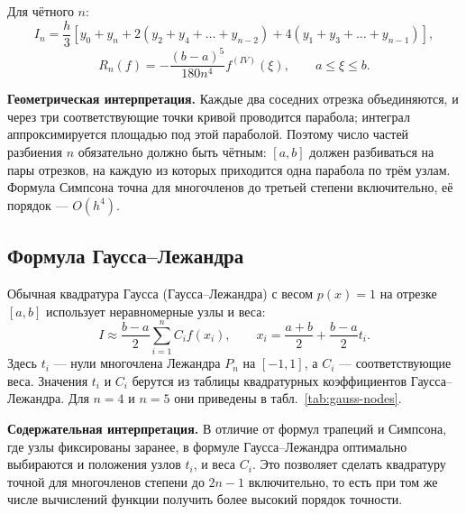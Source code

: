 \documentclass[14pt,a4paper]{extarticle}
\begin{document}
Для чётного $n$:
\begin{equation}
    I_n=\frac{h}{3}\left[y_0+y_n
       +2(y_2+y_4+\ldots+y_{n-2})
       +4(y_1+y_3+\ldots+y_{n-1})\right],
    \label{eq:simpson}
\end{equation}
\begin{equation}
    R_n(f)=-\frac{(b-a)^5}{180n^4}f^{(IV)}(\xi),\qquad a\le \xi\le b .
    \label{eq:simpson-error}
\end{equation}

\textbf{Геометрическая интерпретация.} Каждые два соседних отрезка
объединяются, и через три соответствующие точки кривой проводится
парабола; интеграл аппроксимируется площадью под этой параболой.
Поэтому число частей разбиения $n$ обязательно должно быть чётным:
$[a,b]$ должен разбиваться на пары отрезков, на каждую из которых
приходится одна парабола по трём узлам. Формула Симпсона точна для
многочленов до третьей степени включительно, её порядок --- $O(h^4)$.

\subsection{Формула Гаусса--Лежандра}

Обычная квадратура Гаусса (Гаусса--Лежандра) с весом $p(x)=1$
на отрезке $[a,b]$ использует неравномерные узлы и веса:
\begin{equation}
    I\approx\frac{b-a}{2}\sum_{i=1}^{n}C_i f(x_i),\qquad
    x_i=\frac{a+b}{2}+\frac{b-a}{2}t_i .
    \label{eq:gauss}
\end{equation}
Здесь $t_i$ --- нули многочлена Лежандра $P_n$ на $[-1,1]$, а $C_i$ ---
соответствующие веса. Значения $t_i$ и $C_i$ берутся из таблицы
квадратурных коэффициентов Гаусса--Лежандра. Для $n=4$ и $n=5$
они приведены в табл.~\ref{tab:gauss-nodes}.

\textbf{Содержательная интерпретация.} В отличие от формул трапеций
и Симпсона, где узлы фиксированы заранее, в формуле Гаусса--Лежандра оптимально
выбираются и положения узлов $t_i$, и веса $C_i$. Это позволяет сделать
квадратуру точной для многочленов степени до $2n-1$ включительно,
то есть при том же числе вычислений функции получить более высокий
порядок точности.
\end{document}
